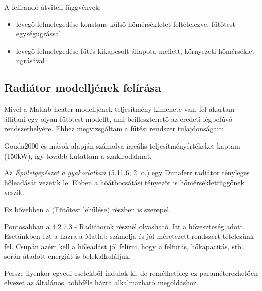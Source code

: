 A felírandó átviteli függvények:

\begin{itemize}[noitemsep,topsep=0pt,parsep=0pt,partopsep=0pt]
	\item levegő felmelegedése konstans külső hőmérsékletet feltételezve, fűtőtest egységugrással
	\item levegő felmelegedése fűtés kikapcsolt állapota mellett, környezeti hőmérséklet ugrásával
\end{itemize}

\pagebreak

\subsection{Radiátor modelljének felírása}

Mivel a Matlab heater modelljének teljesítmény kimenete van, fel akartam állítani egy olyan fűtőtest modellt, ami beillesztehető az eredeti légbefúvó rendszerhelyére. Ehhez megvizsgáltam a fűtési rendszer tulajdonságait:


Gouda2000 és mások alapján számolva irreális teljesítményértékeket kaptam (150kW), így tovább kutattam a szakirodalmat.

Az \textit{Épületgépészet a gyakorlatban} (5.11.6, 2. o.) egy Dunaferr radiátor tényleges hőleadását vezetik le. Ebben a hőátbocsátási tényezőt is hőmérsékletfüggőnek veszik.

Ez bővebben a \cite[4.2.4.1]{Herz} (Fűtőtest lehűlése) részben is szerepel.

Pontosabban a 4.2.7.3 - Radiátorok résznél olvasható. Itt a hőveszteség adott. Esetünkben ezt a házra a Matlab számolja és jól méretezett rendszert tételezünk fel. Csupán azért kell a hőleadást jól felírni, hogy a felfutás, hőkapacitás, stb. során átadott energiát is belekalkuláljuk.

Persze ilyenkor egyedi esetekből indulok ki, de remélhetőleg ez paraméterezhetően elvezet az általános, többféle házra alkalmazható megoldáshoz.

